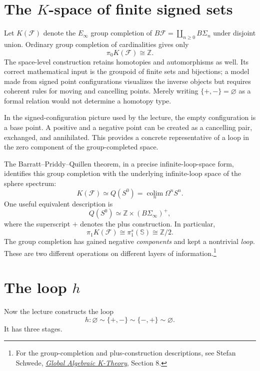 \section[The K-space of finite signed sets]{The \(K\)-space of finite signed sets}

Let $K(\mathcal F)$ denote the $E_\infty$ group completion of
$B\mathcal F=\coprod_{n\ge0}B\Sigma_n$ under disjoint union. Ordinary group completion of cardinalities gives only
\[
 \pi_0K(\mathcal F)\cong\mathbb Z.
\]
The space-level construction retains homotopies and automorphisms as well. Its correct mathematical input is the groupoid of finite sets and bijections; a model made from signed point configurations visualizes the inverse objects but requires coherent rules for moving and cancelling points. Merely writing $\{+,-\}=\varnothing$ as a formal relation would not determine a homotopy type.

In the signed-configuration picture used by the lecture, the empty configuration is a base point. A positive and a negative point can be created as a cancelling pair, exchanged, and annihilated. This provides a concrete representative of a loop in the zero component of the group-completed space.

The Barratt--Priddy--Quillen theorem, in a precise infinite-loop-space form, identifies this group completion with the underlying infinite-loop space of the sphere spectrum:
\[
 \boxed{K(\mathcal F)\simeq Q(S^0)
       =\operatorname*{colim}_{n}\Omega^n S^n.}
\]
One useful equivalent description is
\[
 Q(S^0)\simeq\mathbb Z\times(B\Sigma_\infty)^+,
\]
where the superscript $+$ denotes the plus construction. In particular,
\[
 \boxed{\pi_1 K(\mathcal F)\cong\pi_1^s(\mathbb S)
             \cong\mathbb Z/2.}
\]
The group completion has gained negative \emph{components} and kept a nontrivial \emph{loop}. These are two different operations on different layers of information.\footnote{For the group-completion and plus-construction descriptions, see Stefan Schwede, \href{https://www.math.uni-bonn.de/~schwede/GlobalAlgebraicKtheory-JTopol.pdf}{\emph{Global Algebraic K-Theory}}, Section 8.}


\section[The loop h]{The loop \(h\)}

Now the lecture constructs the loop
\[
  h:\varnothing
  \sim \{+,-\}
  \sim \{-,+\}
  \sim \varnothing.
\]
It has three stages.

